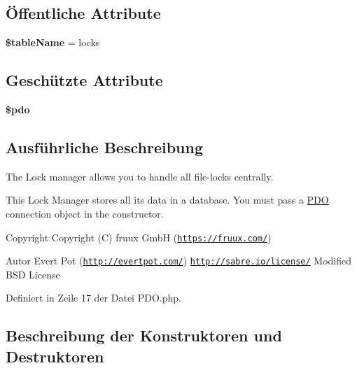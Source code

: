 \subsection*{Öffentliche Attribute}
\begin{DoxyCompactItemize}
\item 
\mbox{\label{class_sabre_1_1_d_a_v_1_1_locks_1_1_backend_1_1_p_d_o_aa21d6d44f2853700dd7563ede32f5a1d}} 
{\bfseries \$table\+Name} = \textquotesingle{}locks\textquotesingle{}
\end{DoxyCompactItemize}
\subsection*{Geschützte Attribute}
\begin{DoxyCompactItemize}
\item 
\mbox{\label{class_sabre_1_1_d_a_v_1_1_locks_1_1_backend_1_1_p_d_o_a6058caa52e051c69361303949606d92b}} 
{\bfseries \$pdo}
\end{DoxyCompactItemize}


\subsection{Ausführliche Beschreibung}
The Lock manager allows you to handle all file-\/locks centrally.

This Lock Manager stores all its data in a database. You must pass a \mbox{\hyperlink{class_sabre_1_1_d_a_v_1_1_locks_1_1_backend_1_1_p_d_o}{P\+DO}} connection object in the constructor.

\begin{DoxyCopyright}{Copyright}
Copyright (C) fruux GmbH (\href{https://fruux.com/}{\tt https\+://fruux.\+com/}) 
\end{DoxyCopyright}
\begin{DoxyAuthor}{Autor}
Evert Pot (\href{http://evertpot.com/}{\tt http\+://evertpot.\+com/})  \href{http://sabre.io/license/}{\tt http\+://sabre.\+io/license/} Modified B\+SD License 
\end{DoxyAuthor}


Definiert in Zeile 17 der Datei P\+D\+O.\+php.



\subsection{Beschreibung der Konstruktoren und Destruktoren}
\mbox{\label{class_sabre_1_1_d_a_v_1_1_locks_1_1_backend_1_1_p_d_o_a6047167851133f9f6eb8cc8176cd04db}} 
